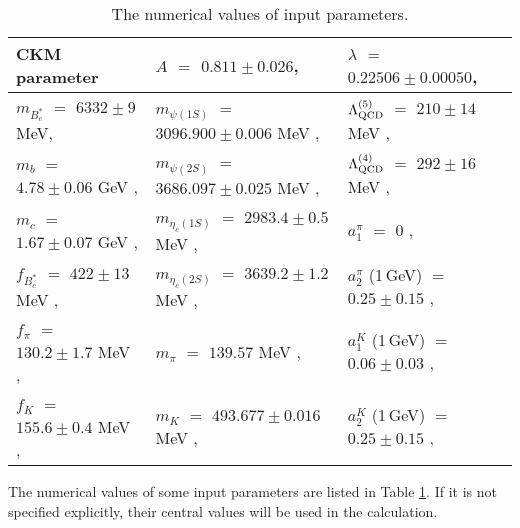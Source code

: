 \documentclass[preprint,superscriptaddress,nofootinbib]{revtex4}
\begin{document}
   \begin{table}[ht]
   \caption{The numerical values of input parameters.}
   \label{tab:input}
   \begin{ruledtabular}
   \begin{tabular}{lll}
    CKM parameter\cite{pdg}
  & $A$ $=$ $0.811{\pm}0.026$,
  & ${\lambda}$  $=$ $0.22506{\pm}0.00050$, \\ \hline
    $m_{B_{c}^{\ast}}$ $=$ $6332{\pm}9$ MeV\footnotemark[1] \cite{prd86.094510},
  & $m_{{\psi}(1S)}$ $=$ $3096.900{\pm}0.006$ MeV \cite{pdg},
  & ${\Lambda}^{(5)}_{\rm QCD}$ $=$ $210{\pm}14$ MeV \cite{pdg}, \\
    $m_{b}$ $=$ $4.78{\pm}0.06$ GeV \cite{pdg},
  & $m_{{\psi}(2S)}$ $=$ $3686.097{\pm}0.025$ MeV \cite{pdg},
  & ${\Lambda}^{(4)}_{\rm QCD}$ $=$ $292{\pm}16$ MeV \cite{pdg}, \\
    $m_{c}$ $=$ $1.67{\pm}0.07$ GeV \cite{pdg},
  & $m_{{\eta}_{c}(1S)}$ $=$ $2983.4{\pm}0.5$ MeV \cite{pdg},
  & $a_{1}^{\pi}$ $=$ $0$ \cite{jhep.0605.004}, \\
    $f_{B_{c}^{\ast}}$ $=$ $422{\pm}13$ MeV \cite{prd91.114509},
  & $m_{{\eta}_{c}(2S)}$ $=$ $3639.2{\pm}1.2$ MeV \cite{pdg},
  & $a_{2}^{\pi}$ (1\,GeV) $=$ $0.25{\pm}0.15$ \cite{jhep.0605.004}, \\
    $f_{\pi}$ $=$ $130.2{\pm}1.7$ MeV \cite{pdg},
  & $m_{\pi}$ $=$ $139.57$ MeV \cite{pdg},
  & $a_{1}^{K}$ (1\,GeV) $=$ $0.06{\pm}0.03$ \cite{jhep.0605.004}, \\
    $f_{K}$ $=$ $155.6{\pm}0.4$ MeV \cite{pdg},
  & $m_{K}$ $=$ $493.677{\pm}0.016$ MeV \cite{pdg},
  & $a_{2}^{K}$ (1\,GeV) $=$ $0.25{\pm}0.15$ \cite{jhep.0605.004}, \\
   \end{tabular}
   \end{ruledtabular}
   \end{table}

  The numerical values of some input parameters are listed in
  Table \ref{tab:input}. If it is not specified explicitly,
  their central values will be used in the calculation.
\end{document}
